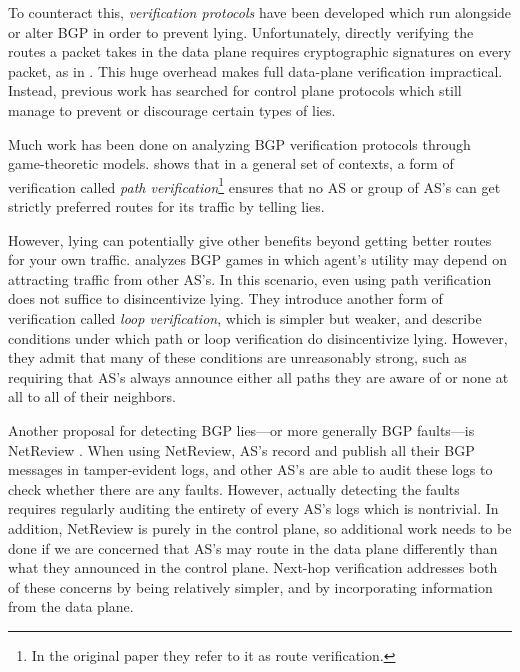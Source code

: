 \documentclass[10pt]{article}
\begin{document}
    To counteract this, \emph{verification protocols} have been developed which
    run alongside or alter BGP in order to prevent lying.
    Unfortunately, directly verifying the routes a packet takes in the data plane
    requires cryptographic signatures on every packet, as in \cite{DataPlane}.
    This huge overhead makes full data-plane verification impractical.
    Instead, previous work has searched for control plane protocols
    which still manage to prevent or discourage certain types of lies.

    Much work has been done on analyzing BGP verification protocols
    through game-theoretic models.
    \cite{RoutingGames} shows that in a general set of contexts, a form of
    verification called \emph{path verification}\footnote{
      In the original
      paper they refer to it as route verification.}
    ensures that no AS or group of
    AS's can get strictly preferred routes for its traffic by telling lies.

    However, lying can potentially give other benefits beyond getting better
    routes for your own traffic.
    \cite{Attraction} analyzes BGP games in which agent's utility may depend
    on attracting traffic from other AS's.
    In this scenario, even using path verification does not suffice to
    disincentivize lying.
    They introduce another form of verification
    called \emph{loop verification}, which is simpler but weaker, and describe
    conditions under which path or loop verification do disincentivize lying.
    However, they admit that many of these conditions are unreasonably strong,
    such as requiring that AS's always announce either all paths they are aware
    of or none at all to all of their neighbors.
    
    Another proposal for detecting BGP lies---or more generally BGP faults---is NetReview \cite{NetReview}. When using NetReview, AS's record and publish all their BGP messages in tamper-evident logs, and other AS's are able to audit these logs to check whether there are any faults. However, actually detecting the faults requires regularly auditing the entirety of every AS's logs which is nontrivial. In addition, NetReview is purely in the control plane, so additional work needs to be done if we are concerned that AS's may route in the data plane differently than what they announced in the control plane. Next-hop verification addresses both of these concerns by being relatively simpler, and by incorporating information from the data plane.
\end{document}
